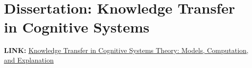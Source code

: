 \documentclass[11pt, oneside]{article}   	%
\begin{document}











\section{Dissertation: Knowledge Transfer in Cognitive Systems}

\noindent \textbf{LINK:} \href{https://edoc.ub.uni-muenchen.de/28655/}{Knowledge Transfer in Cognitive Systems Theory: Models, Computation, and Explanation} \\




\end{document}
